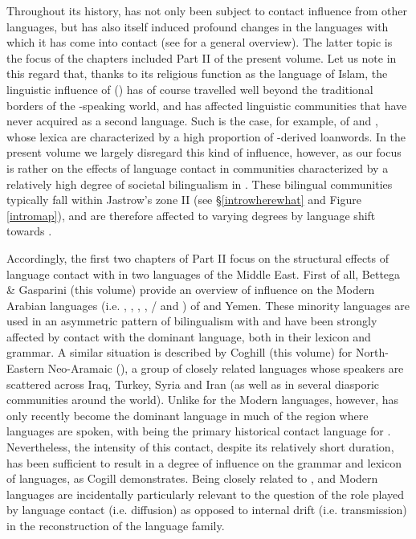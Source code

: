 \documentclass[output=paper]{langsci/langscibook}
\begin{document}
Throughout its history,  has not only been subject to contact influence from other languages, but has also itself induced profound changes in the languages with which it has come into contact (see \citealt{Versteegh2001article} for a general overview). The latter topic is the focus of the chapters included Part II of the present volume. Let us note in this regard that, thanks to its religious function as the language of Islam, the linguistic influence of ()  has of course travelled well beyond the traditional borders of the -speaking world, and has affected linguistic communities that have never acquired  as a second language. Such is the case, for example, of  and , whose lexica are characterized by a high proportion of -derived {loanwords}. In the present volume we largely disregard this kind of influence, however, as our focus is rather on the effects of language contact in communities characterized by a relatively high degree of societal {bilingualism} in . These bilingual communities typically fall within Jastrow’s zone II (see §\ref{introwherewhat} and Figure \ref{intromap}), and are therefore affected to varying degrees by {language shift} towards .

Accordingly, the first two chapters of Part II focus on the structural effects of language contact with  in two  languages of the Middle East. First of all, Bettega \& Gasparini (this volume) provide an overview of  influence on the Modern  Arabian languages (i.e. , , , , / and ) of  and {Yemen}. These minority languages are used in an asymmetric pattern of {bilingualism} with  and have been strongly affected by contact with the dominant language, both in their lexicon and grammar. A similar situation is described by Coghill (this volume) for North-Eastern Neo-Aramaic (), a group of closely related languages whose speakers are scattered across Iraq, Turkey, Syria and Iran (as well as in several diasporic communities around the world). Unlike for the Modern  languages, however,  has only recently become the dominant language in much of the region where  languages are spoken, with  being the primary historical contact language for . Nevertheless, the intensity of this contact, despite its relatively short duration, has been sufficient to result in a degree of influence on the grammar and lexicon of  languages, as Cogill demonstrates. Being closely related to ,  and Modern  languages are incidentally particularly relevant to the question of the role played by language contact (i.e. {diffusion}) as opposed to internal drift (i.e. {transmission}) in the reconstruction of the  language family.
\end{document}
